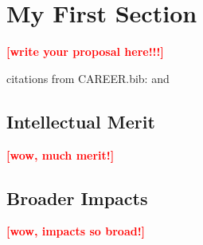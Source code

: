 \documentclass[11pt,oneside,onecolumn,letterpaper]{article}
\newcommand{\todo}[1]{\textcolor{red}{\textbf{[#1]}}}
\begin{document}
\section{My First Section}

\todo{write your proposal here!!!}

citations from CAREER.bib: \cite{GuoCHI2017} and \cite{GuoCHI2018}


\subsection{Intellectual Merit}

\todo{wow, much merit!}

\subsection{Broader Impacts}

\todo{wow, impacts so broad!}



%
{\vbox{}}
\end{document}
